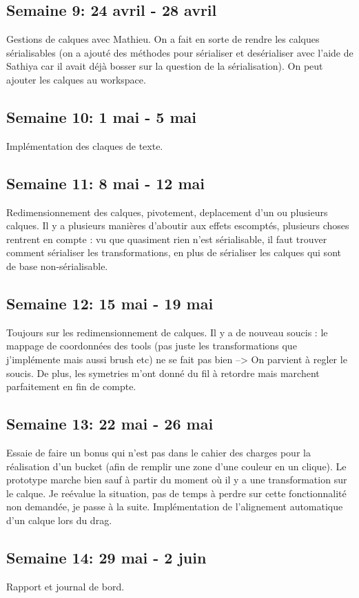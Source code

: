 \subsection{Semaine 9: 24 avril - 28 avril}
Gestions de calques avec Mathieu. On a fait en sorte de rendre les calques sérialisables (on a ajouté des méthodes pour sérialiser et desérialiser avec l'aide de Sathiya car il avait déjà bosser sur la question de la sérialisation). On peut ajouter les calques au workspace.
\subsection{Semaine 10: 1 mai - 5 mai}
Implémentation des claques de texte.
\subsection{Semaine 11: 8 mai - 12 mai} 
Redimensionnement des calques, pivotement, deplacement d'un ou plusieurs calques. Il y a plusieurs manières d'aboutir aux effets escomptés, plusieurs choses rentrent en compte : vu que quasiment rien n'est sérialisable, il faut trouver comment sérialiser les transformations, en plus de sérialiser les calques qui sont de base non-sérialisable.
\subsection{Semaine 12: 15 mai - 19 mai}
Toujours sur les redimensionnement de calques. Il y a de nouveau soucis : le mappage de coordonnées des tools (pas juste les transformations que j'implémente mais aussi brush etc) ne se fait pas bien --> On parvient à regler le soucis. De plus, les symetries m'ont donné du fil à retordre mais marchent parfaitement en fin de compte.
\subsection{Semaine 13: 22 mai - 26 mai}
Essaie de faire un bonus qui n'est pas dans le cahier des charges pour la réalisation d'un bucket (afin de remplir une zone d'une couleur en un clique). Le prototype marche bien sauf à partir du moment où il y a une transformation sur le calque. Je reévalue la situation, pas de temps à perdre sur cette fonctionnalité non demandée, je passe à la suite. Implémentation de l'alignement automatique d'un calque lors du drag.
\subsection{Semaine 14: 29 mai - 2 juin}
Rapport et journal de bord.





